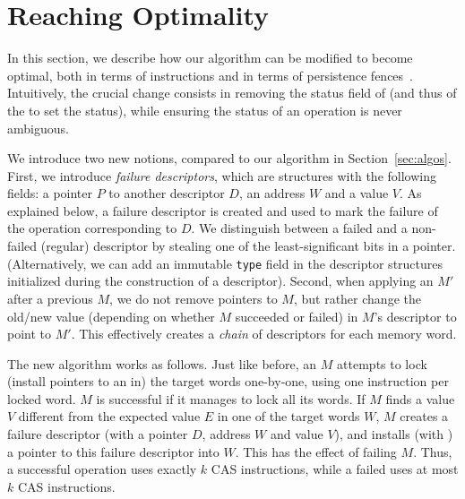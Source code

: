 \section{Reaching Optimality}\label{sec:optimality}

In this section, we describe how our algorithm can be modified to become optimal, both in terms of \cas{} instructions and in terms of persistence fences~\cite{cohen18}.
Intuitively, the crucial change consists in removing the status field of \mcasdescriptor{} (and thus of the \cas{} to set the status), while ensuring the status of an operation is never ambiguous.

We introduce two new notions, compared to our algorithm in Section~\ref{sec:algos}.
First, we introduce \textit{failure descriptors}, which are structures with the following fields: a pointer $P$ to another descriptor $D$, an address $W$ and a value $V$.
As explained below, a failure descriptor is created and used to mark the failure of the \mcas{} operation corresponding to $D$.
We distinguish between a failed and a non-failed (regular) descriptor by stealing one of the least-significant bits in a pointer.
(Alternatively, we can add an immutable \texttt{type} field in the descriptor structures initialized during the construction of a descriptor).
Second, when applying an \mcas{} $M'$ after a previous \mcas{} $M$, we do not remove pointers to $M$, but rather change the old/new value (depending on whether $M$ succeeded or failed) in $M$'s descriptor to point to $M'$. 
This effectively creates a \textit{chain} of descriptors for each memory word.
 
The new algorithm works as follows.  
Just like before, an \mcas{} $M$ attempts to lock (install pointers to an \mcasdescriptor{} in) the target words one-by-one, using one \cas{} instruction per locked word.
$M$ is successful if it manages to lock all its words.
If $M$ finds a value $V$ different from the expected value $E$ in one of the target words $W$, $M$ creates a failure descriptor (with a pointer $D$, address $W$ and value $V$), and installs (with \cas{}) a pointer to this failure descriptor into $W$. 
This has the effect of failing $M$.
Thus, a successful \mcas{} operation uses exactly $k$ CAS instructions, while a failed \mcas{} uses at most $k$ CAS instructions. 

